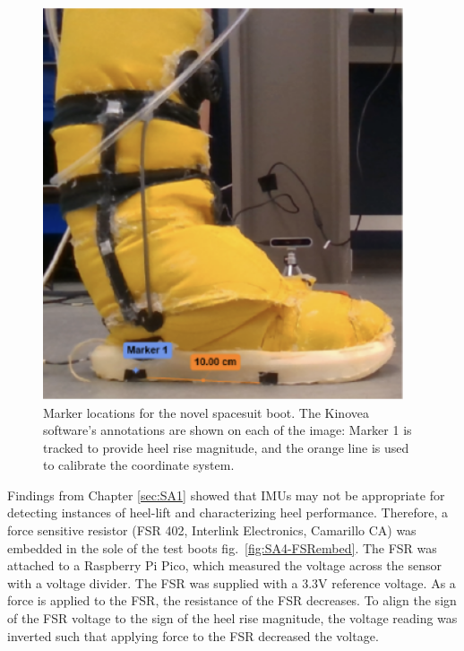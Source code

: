 \documentclass[defaultstyle,11pt]{thesis}
\begin{document}
\hypertarget{fig:SA4-Kinovea}{%
\begin{figure}
\centering
\includegraphics[width=0.95\textwidth,height=\textheight]{../fig/SA4/Kinovea.png}
\caption[{Marker location for heel position tracking.}]{Marker locations for the novel spacesuit boot. The Kinovea software's annotations are shown on each of the image: Marker 1 is tracked to provide heel rise magnitude, and the orange line is used to calibrate the coordinate system.}
\label{fig:SA4-Kinovea}
\end{figure}
}

Findings from Chapter \ref{sec:SA1} showed that IMUs may not be appropriate for detecting instances of heel-lift and characterizing heel performance.
Therefore, a force sensitive resistor (FSR 402, Interlink Electronics, Camarillo CA) was embedded in the sole of the test boots fig.~\ref{fig:SA4-FSRembed}.
The FSR was attached to a Raspberry Pi Pico, which measured the voltage across the sensor with a voltage divider.
The FSR was supplied with a 3.3V reference voltage.
As a force is applied to the FSR, the resistance of the FSR decreases.
To align the sign of the FSR voltage to the sign of the heel rise magnitude, the voltage reading was inverted such that applying force to the FSR decreased the voltage.
\end{document}
